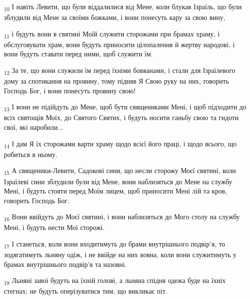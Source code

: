 \begin{tcolorbox}
\textsubscript{10} І навіть Левити, що були віддалилися від Мене, коли блукав Ізраїль, що були зблудили від Мене за своїми божками, і вони понесуть кару за свою вину,
\end{tcolorbox}
\begin{tcolorbox}
\textsubscript{11} і будуть вони в святині Моїй служити сторожами при брамах храму, і обслуговувати храм, вони будуть приносити цілопалення й жертву народові, і вони будуть ставати перед ними, щоб служити їм.
\end{tcolorbox}
\begin{tcolorbox}
\textsubscript{12} За те, що вони служили їм перед їхніми бовванами, і стали для Ізраїлевого дому за спотикання на провину, тому підняв Я Свою руку на них, говорить Господь Бог, і вони понесуть провину свою!
\end{tcolorbox}
\begin{tcolorbox}
\textsubscript{13} І вони не підійдуть до Мене, щоб бути священиками Мені, і щоб підходити до всіх святощів Моїх, до Святого Святих, і будуть носити ганьбу свою та гидоти свої, які наробили...
\end{tcolorbox}
\begin{tcolorbox}
\textsubscript{14} І дам Я їх сторожами варти храму щодо всієї його праці, і щодо всього, що робиться в ньому.
\end{tcolorbox}
\begin{tcolorbox}
\textsubscript{15} А священики-Левити, Садокові сини, що несли сторожу Моєї святині, коли Ізраїлеві сини зблудили були від Мене, вони наблизяться до Мене на службу Мені, і будуть стояти перед Моїм лицем, щоб приносити Мені лій та кров, говорить Господь Бог.
\end{tcolorbox}
\begin{tcolorbox}
\textsubscript{16} Вони ввійдуть до Моєї святині, і вони наблизяться до Мого столу на службу Мені, і будуть нести Мої сторожі.
\end{tcolorbox}
\begin{tcolorbox}
\textsubscript{17} І станеться, коли вони входитимуть до брами внутрішнього подвір'я, то зодягатимуть льняну одіж, і не ввійде на них вовна, коли вони служитимуть у брамах внутрішнього подвір'я та назовні.
\end{tcolorbox}
\begin{tcolorbox}
\textsubscript{18} Льняні завої будуть на їхній голові, а льняна спідня одежа буде на їхніх стегнах; не будуть оперізуватися тим, що викликає піт.
\end{tcolorbox}
